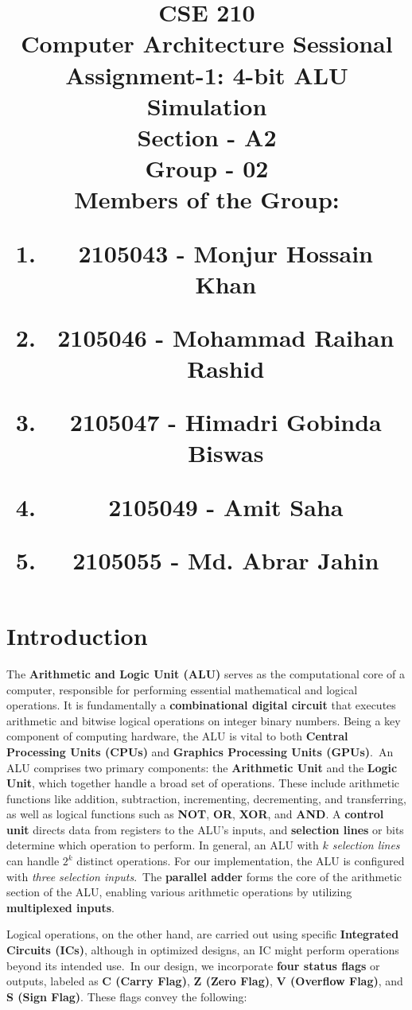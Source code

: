 \documentclass[12pt]{article}
\title{CSE 210 \\
Computer Architecture Sessional \\
\vspace{10mm}
Assignment-1: 4-bit ALU Simulation \\
\vspace{20mm}
Section - A2 \\
Group - 02 \\
\vspace{15mm}
\RaggedRight
Members of the Group: \\
\normalsize	{
\begin{enumerate}[label=\roman*]
    \item 2105043 - Monjur Hossain Khan
    \item 2105046 - Mohammad Raihan Rashid
    \item 2105047 - Himadri Gobinda Biswas
    \item 2105049 - Amit Saha
    \item 2105055 - Md. Abrar Jahin
\end{enumerate}
}
}
\author{}
\date{}
\begin{document}
\maketitle

\newpage

\section{\large{Introduction}} The \textbf{Arithmetic and Logic Unit (ALU)} serves as the computational core of a computer, responsible for performing essential mathematical and logical operations. It is fundamentally a \textbf{combinational digital circuit} that executes arithmetic and bitwise logical operations on integer binary numbers. Being a key component of computing hardware, the ALU is vital to both \textbf{Central Processing Units (CPUs)} and \textbf{Graphics Processing Units (GPUs)}.\ An ALU comprises two primary components: the \textbf{Arithmetic Unit} and the \textbf{Logic Unit}, which together handle a broad set of operations. These include arithmetic functions like addition, subtraction, incrementing, decrementing, and transferring, as well as logical functions such as \textbf{NOT}, \textbf{OR}, \textbf{XOR}, and \textbf{AND}. A \textbf{control unit} directs data from registers to the ALU's inputs, and \textbf{selection lines} or bits determine which operation to perform. In general, an ALU with \textit{$k$ selection lines} can handle \textit{$2^k$} distinct operations. For our implementation, the ALU is configured with \textit{three selection inputs}.\ The \textbf{parallel adder} forms the core of the arithmetic section of the ALU, enabling various arithmetic operations by utilizing \textbf{multiplexed inputs}. 

Logical operations, on the other hand, are carried out using specific \textbf{Integrated Circuits (ICs)}, although in optimized designs, an IC might perform operations beyond its intended use.\ In our design, we incorporate \textbf{four status flags} or outputs, labeled as \textbf{C (Carry Flag)}, \textbf{Z (Zero Flag)}, \textbf{V (Overflow Flag)}, and \textbf{S (Sign Flag)}. These flags convey the following:
\end{document}
